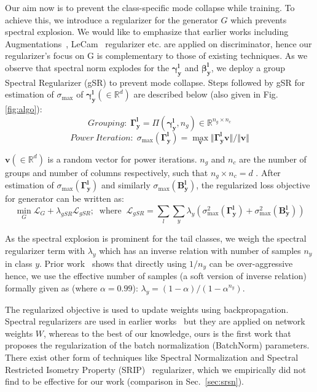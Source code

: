 \documentclass[runningheads,table]{llncs}
\begin{document}
Our aim now is to prevent the class-specific mode collapse while training. To achieve this, we introduce a regularizer for the generator $G$ which prevents spectral explosion. We would like to emphasize that earlier works including Augmentations~\cite{zhao2020differentiable}, LeCam~\cite{tseng2021regularizing} regularizer etc. are applied on discriminator, hence our regularizer's focus on G is complementary to those of existing techniques. As we observe that spectral norm explodes for the $\mathbf{\gamma^l_{y}}$ and $\mathbf{\beta^l_{y}}$, we deploy a group Spectral Regularizer (gSR) to prevent mode collapse. Steps followed by gSR for estimation of $\sigma_{\max}$ of $\mathbf{\gamma^l_{y}} (\in \mathbb{R}^d)$ are described below (also given in Fig. \ref{fig:algo}):
\begin{equation}
    \label{eq:grouping}
    Grouping: \; \mathbf{\Gamma^l_y} = \Pi(\mathbf{\gamma^l_y}, n_g) \in \mathbb{R}^{n_g \times n_c} 
\end{equation}
\begin{equation}
    \label{eq:power_iter}
    Power\ Iteration: \; \sigma_{\max}(\mathbf{\Gamma^l_y}) = \max_{\mathbf{v}} {\Vert\mathbf{\Gamma^l_yv}\Vert}/{\Vert \mathbf{v}\Vert}
\end{equation}

$\mathbf{\mathbf{v}}(\in \mathbb{R}^d)$ is a random vector for power iterations. $n_g$ and $n_c$ are the number of groups and number of columns respectively, such that $n_g \times n_c = d$ . After estimation of $\sigma_{\max}(\mathbf{\Gamma^l_y})$ and similarly  $\sigma_{\max}(\mathbf{B^l_y})$, the regularized loss objective for generator can be written as:
\begin{equation}
\label{eq:reg_loss}
    \min_{G} \mathcal{L}_{    G} + \lambda_{gSR} \mathcal{L}_{gSR} ; \; \; \text{where} \; \;     \mathcal{L}_{gSR} = \sum_l \sum_{y} \lambda_y (\sigma^2_{\max}(\mathbf{\Gamma_{y}^l}) + \sigma^2_{\max}(\mathbf{B_{y}^l}))
\end{equation}


As the spectral explosion is prominent for the tail classes, we weigh the spectral regularizer term with $\lambda_y$ which has an inverse relation with number of samples $n_y$ in class $y$. Prior work~\cite{cao2019learning} shows that directly using $1/n_y$ can be over-aggressive hence, we use the effective number of samples (a soft version of inverse relation) formally given as (where $\alpha = 0.99$): $\lambda_y = {(1 - \alpha)}/{(1 - \alpha^{n_y})}$.


The regularized objective is used to update weights using backpropagation. Spectral regularizers are used in earlier works~\cite{vahdat2020NVAE, yoshida2017spectral} but they are applied on network weights $W$, whereas to the best of our knowledge, ours is the first work that proposes the regularization of the batch normalization (BatchNorm) parameters. There exist other form of techniques like Spectral Normalization and Spectral Restricted Isometry Property (SRIP)~\cite{bansal2018can} regularizer, which we empirically did not find to be effective for our work (comparison in Sec.~\ref{sec:srsn}). \\
\end{document}
